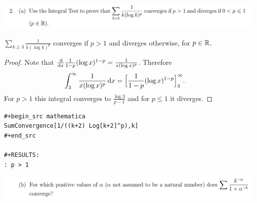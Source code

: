 \documentclass[12pt]{article}
\begin{document}
\newpage
\subsection{}
\begin{mdframed}
\includegraphics[width=400pt]{img/analysis--oxford-M2-I-6-2.png}
\end{mdframed}

\begin{claim*}
  $\sum_{k\geq3} \frac{1}{k(\log k)^p}$ converges if $p > 1$ and diverges otherwise, for
  $p \in \mathbb{R}$.
\end{claim*}

\begin{proof}
  Note that $\ddx \frac{1}{1 - p}(\log x)^{1 - p} = \frac{1}{x(\log x)^p}$. Therefore
  \begin{align*}
    \int_3^\infty \frac{1}{x(\log x)^p} \dx
    & = \Big[\frac{1}{1 - p}(\log x)^{1 - p}\Big]_3^\infty.
  \end{align*}
  For $p > 1$ this integral converges to $\frac{\log 3}{p - 1}$ and for $p \leq 1$ it diverges.
\end{proof}

\begin{verbatim}
#+begin_src mathematica
SumConvergence[1/((k+2) Log[k+2]^p),k]
#+end_src

#+RESULTS:
: p > 1

\end{verbatim}

\begin{mdframed}
\includegraphics[width=400pt]{img/analysis--oxford-M2-I-6-2-b.png}
\end{mdframed}
\end{document}
